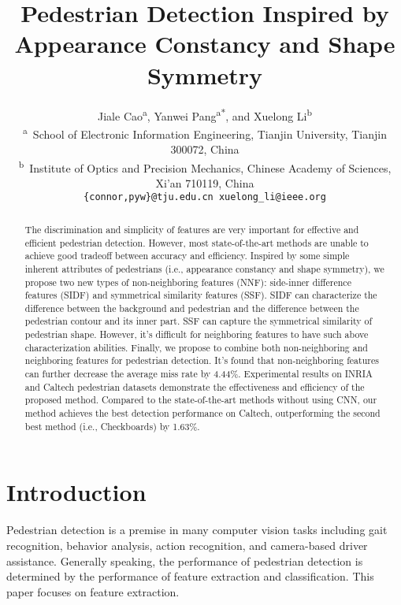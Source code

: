 \documentclass[10pt,twocolumn,letterpaper]{article}
\begin{document}
\title{Pedestrian Detection Inspired by Appearance Constancy and Shape Symmetry}

\author{Jiale Cao\textsuperscript{a}, Yanwei Pang\textsuperscript{a*}, and Xuelong Li\textsuperscript{b}\\
\textsuperscript{a}~School of Electronic Information Engineering, Tianjin University, Tianjin 300072, China
\\
\textsuperscript{b}~Institute of Optics and Precision Mechanics, Chinese Academy of Sciences, Xi'an 710119, China\\
{\tt\small \{connor,pyw\}@tju.edu.cn \qquad xuelong{\_}li@ieee.org}
}

\maketitle


\begin{abstract}
The discrimination and simplicity of features are very important for 
effective and efficient pedestrian detection. However, most state-of-the-art 
methods are unable to achieve good tradeoff between accuracy and efficiency. 
Inspired by some 
simple inherent attributes of pedestrians (i.e., appearance constancy and 
shape symmetry), we propose two new types of non-neighboring features (NNF): 
side-inner difference features (SIDF) and symmetrical similarity features 
(SSF). SIDF can characterize the difference between the background and 
pedestrian and the difference between the pedestrian contour and its inner 
part. SSF can capture the symmetrical similarity of pedestrian shape. 
However, it's difficult for neighboring features to have such above 
characterization abilities. Finally, we propose to combine both 
non-neighboring and neighboring features for pedestrian detection. It's 
found that non-neighboring features can further decrease the average miss 
rate by 4.44{\%}. Experimental results on INRIA and Caltech pedestrian 
datasets demonstrate the effectiveness and efficiency of the proposed 
method. Compared to the state-of-the-art methods without using CNN, our 
method achieves the best detection performance on Caltech, outperforming the 
second best method (i.e., Checkboards) by 1.63{\%}.
\end{abstract}

\section{Introduction}
Pedestrian detection is a premise in many computer vision tasks 
including gait recognition, behavior analysis, action recognition, and 
camera-based driver assistance. Generally speaking, the performance of 
pedestrian detection is determined by the performance of feature extraction 
and classification. This paper focuses on feature extraction. 
\end{document}
